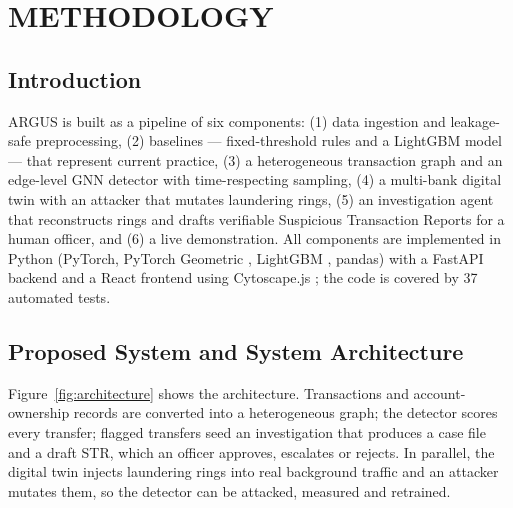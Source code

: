 \chapter{METHODOLOGY}

\section{Introduction}
ARGUS is built as a pipeline of six components: (1) data ingestion and leakage-safe preprocessing, (2) baselines --- fixed-threshold rules and a LightGBM model --- that represent current practice, (3) a heterogeneous transaction graph and an edge-level GNN detector with time-respecting sampling, (4) a multi-bank digital twin with an attacker that mutates laundering rings, (5) an investigation agent that reconstructs rings and drafts verifiable Suspicious Transaction Reports for a human officer, and (6) a live demonstration. All components are implemented in Python (PyTorch, PyTorch Geometric \cite{fey2019fast}, LightGBM \cite{ke2017lightgbm}, pandas) with a FastAPI backend and a React frontend using Cytoscape.js \cite{franz2016cytoscape}; the code is covered by 37 automated tests.

\section{Proposed System and System Architecture}
Figure~\ref{fig:architecture} shows the architecture. Transactions and account-ownership records are converted into a heterogeneous graph; the detector scores every transfer; flagged transfers seed an investigation that produces a case file and a draft STR, which an officer approves, escalates or rejects. In parallel, the digital twin injects laundering rings into real background traffic and an attacker mutates them, so the detector can be attacked, measured and retrained.

